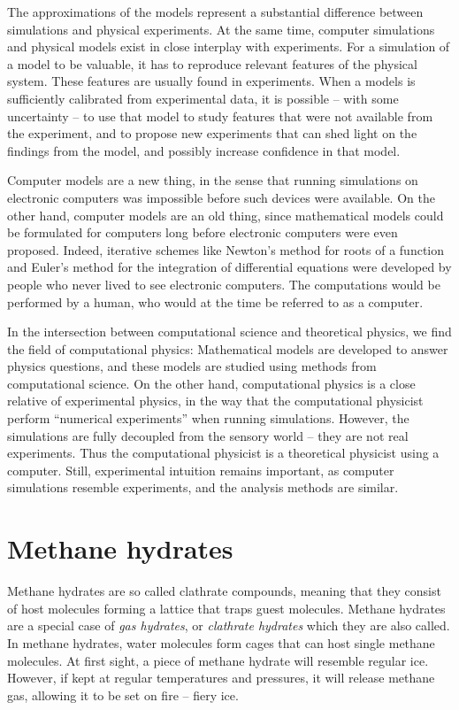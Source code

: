 The approximations of the models represent a substantial difference between simulations and physical experiments. At the same time, computer simulations and physical models exist in close interplay with experiments. For a simulation of a model to be valuable, it has to reproduce relevant features of the physical system. These features are usually found in experiments. When a models is sufficiently calibrated from experimental data, it is possible -- with some uncertainty -- to use that model to study features that were not available from the experiment, and to propose new experiments that can shed light on the findings from the model, and possibly increase confidence in that model.

Computer models are a new thing, in the sense that running simulations on electronic computers was impossible before such devices were available. On the other hand, computer models are an old thing, since mathematical models could be formulated for computers long before electronic computers were even proposed. Indeed, iterative schemes like Newton's method for roots of a function and Euler's method for the integration of differential equations were developed by people who never lived to see electronic computers. The computations would be performed by a human, who would at the time be referred to as a computer. 

In the intersection between computational science and theoretical physics, we find the field of computational physics: Mathematical models are developed to answer physics questions, and these models are studied using methods from computational science. On the other hand, computational physics is a close relative of experimental physics, in the way that the computational physicist perform ``numerical experiments'' when running simulations. However, the simulations are fully decoupled from the sensory world -- they are not real experiments. Thus the computational physicist is a theoretical physicist using a computer. Still, experimental intuition remains important, as computer simulations resemble experiments, and the analysis methods are similar.

\section{Methane hydrates}
Methane hydrates are so called clathrate compounds, meaning that they consist of host molecules forming a lattice that traps guest molecules. Methane hydrates are a special case of \emph{gas hydrates}, or \emph{clathrate hydrates} which they are also called. In methane hydrates, water molecules form cages that can host single methane molecules. At first sight, a piece of methane hydrate will resemble regular ice. However, if kept at regular temperatures and pressures, it will release methane gas, allowing it to be set on fire -- fiery ice. 

